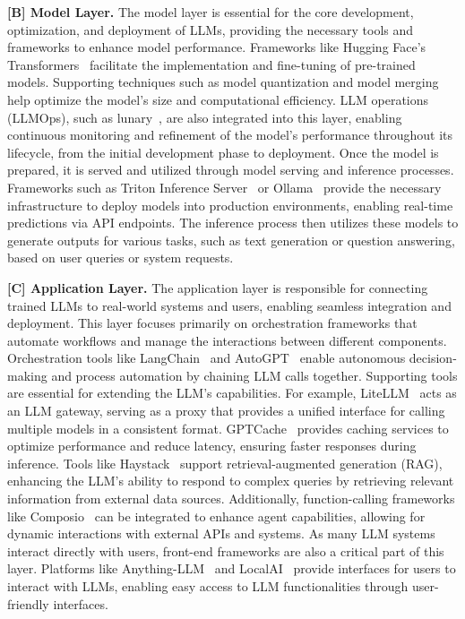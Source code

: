 \noindent \textbf{[B] Model Layer.} The model layer is essential for the core development, optimization, and deployment of LLMs, providing the necessary tools and frameworks to enhance model performance. Frameworks like Hugging Face’s Transformers~\cite{transformers} facilitate the implementation and fine-tuning of pre-trained models. Supporting techniques such as model quantization and model merging help optimize the model’s size and computational efficiency. LLM operations (LLMOps), such as lunary~\cite{lunary}, are also integrated into this layer, enabling continuous monitoring and refinement of the model's performance throughout its lifecycle, from the initial development phase to deployment.
Once the model is prepared, it is served and utilized through model serving and inference processes. Frameworks such as Triton Inference Server~\cite{triton-inference-server} or Ollama~\cite{ollama} provide the necessary infrastructure to deploy models into production environments, enabling real-time predictions via API endpoints. The inference process then utilizes these models to generate outputs for various tasks, such as text generation or question answering, based on user queries or system requests.
    
\noindent \textbf{[C] Application Layer.} The application layer is responsible for connecting trained LLMs to real-world systems and users, enabling seamless integration and deployment. This layer focuses primarily on orchestration frameworks that automate workflows and manage the interactions between different components. Orchestration tools like LangChain~\cite{langchain} and AutoGPT~\cite{AutoGPT} enable autonomous decision-making and process automation by chaining LLM calls together.
Supporting tools are essential for extending the LLM’s capabilities. For example, LiteLLM~\cite{litellm} acts as an LLM gateway, serving as a proxy that provides a unified interface for calling multiple models in a consistent format. GPTCache~\cite{gptcache} provides caching services to optimize performance and reduce latency, ensuring faster responses during inference. Tools like Haystack~\cite{haystack} support retrieval-augmented generation (RAG), enhancing the LLM's ability to respond to complex queries by retrieving relevant information from external data sources. Additionally, function-calling frameworks like Composio~\cite{composio} can be integrated to enhance agent capabilities, allowing for dynamic interactions with external APIs and systems.
As many LLM systems interact directly with users, front-end frameworks are also a critical part of this layer. Platforms like Anything-LLM~\cite{anythingllm} and LocalAI~\cite{localai} provide interfaces for users to interact with LLMs, enabling easy access to LLM functionalities through user-friendly interfaces. 

